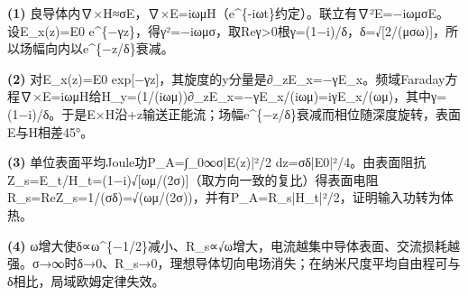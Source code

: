 \par\noindent\textbf{(1)} 良导体内∇×H≈σE，∇×E=iωμH（e\textasciicircum{}\{-iωt\}约定）。联立有∇²E=−iωμσE。设E\_x(z)=E0 e\textasciicircum{}\{−γz\}，得γ²=−iωμσ，取Reγ>0根γ=(1−i)/δ，δ=√[2/(μσω)]，所以场幅向内以e\textasciicircum{}\{−z/δ\}衰减。
\par\noindent\textbf{(2)} 对E\_x(z)=E0 exp[−γz]，其旋度的y分量是∂\_zE\_x=−γE\_x。频域Faraday方程∇×E=iωμH给H\_y=(1/(iωμ))∂\_zE\_x=−γE\_x/(iωμ)=iγE\_x/(ωμ)，其中γ=(1−i)/δ。于是E×H沿+z输送正能流；场幅e\textasciicircum{}\{−z/δ\}衰减而相位随深度旋转，表面E与H相差45°。
\par\noindent\textbf{(3)} 单位表面平均Joule功P\_A=∫\_0∞σ|E(z)|²/2 dz=σδ|E0|²/4。由表面阻抗Z\_s=E\_t/H\_t=(1−i)√[ωμ/(2σ)]（取方向一致的复比）得表面电阻R\_s=ReZ\_s=1/(σδ)=√(ωμ/(2σ))，并有P\_A=R\_s|H\_t|²/2，证明输入功转为体热。
\par\noindent\textbf{(4)} ω增大使δ∝ω\textasciicircum{}\{−1/2\}减小、R\_s∝√ω增大，电流越集中导体表面、交流损耗越强。σ→∞时δ→0、R\_s→0，理想导体切向电场消失；在纳米尺度平均自由程可与δ相比，局域欧姆定律失效。
